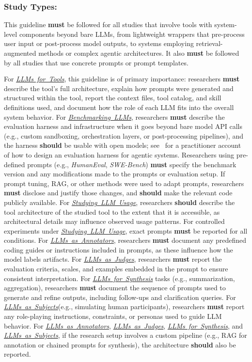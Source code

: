 \documentclass[smallextended]{svjour3}
\newcommand{\must}{\textbf{must}\xspace}
\newcommand{\should}{\textbf{should}\xspace}
\newcommand{\annotators}{\hyperref[sec:llms-as-annotators]{\mbox{\emph{LLMs as Annotators}}}\xspace}
\newcommand{\judges}{\hyperref[sec:llms-as-judges]{\mbox{\emph{LLMs as Judges}}}\xspace}
\newcommand{\synthesis}{\hyperref[sec:llms-for-synthesis]{\mbox{\emph{LLMs for Synthesis}}}\xspace}
\newcommand{\subjects}{\hyperref[sec:llms-as-subjects]{\mbox{\emph{LLMs as Subjects}}}\xspace}
\newcommand{\llmusage}{\hyperref[sec:studying-llm-usage-in-software-engineering]{\mbox{\emph{Studying LLM Usage}}}\xspace}
\newcommand{\newtools}{\hyperref[sec:llms-for-new-software-engineering-tools]{\mbox{\emph{LLMs for Tools}}}\xspace}
\newcommand{\benchmarkingtasks}{\hyperref[sec:benchmarking-llms-for-software-engineering-tasks]{\mbox{\emph{Benchmarking LLMs}}}\xspace}
\newcommand{\annotators}{\href{/study-types/annotators/}{\emph{LLMs as Annotators}}\xspace}
\newcommand{\judges}{\href{/study-types/judges/}{\emph{LLMs as Judges}}\xspace}
\newcommand{\synthesis}{\href{/study-types/synthesis/}{\emph{LLMs for Synthesis}}\xspace}
\newcommand{\subjects}{\href{/study-types/subjects/}{\emph{LLMs as Subjects}}\xspace}
\newcommand{\llmusage}{\href{/study-types/usage/}{\emph{Studying LLM Usage}}\xspace}
\newcommand{\newtools}{\href{/study-types/tools/}{\emph{LLMs for Tools}}\xspace}
\newcommand{\benchmarkingtasks}{\href{/study-types/benchmarking/}{\emph{Benchmarking LLMs}}\xspace}
\newcommand{\guidelinesubsubsection}[1]{\subsubsection{\bfseries #1:}}
\newcommand{\guidelinesubsubsection}[1]{\subsubsection{#1}}
\begin{document}
\guidelinesubsubsection{Study Types}

This guideline \must be followed for all studies that involve tools with system-level components beyond bare LLMs, from lightweight wrappers that pre-process user input or post-process model outputs, to systems employing retrieval-augmented methods or complex agentic architectures.
It also \must be followed by all studies that use concrete prompts or prompt templates.

For \newtools, this guideline is of primary importance: researchers \must describe the tool's full architecture, explain how prompts were generated and structured within the tool, report the context files, tool catalog, and skill definitions used, and document how the role of each LLM fits into the overall system behavior.
For \benchmarkingtasks, researchers \must describe the evaluation harness and infrastructure when it goes beyond bare model API calls (e.g., custom sandboxing, orchestration layers, or post-processing pipelines), and the harness \should be usable with open models; see~\cite{Anthropic2025evals} for a practitioner account of how to design an evaluation harness for agentic systems.
Researchers using pre-defined prompts (e.g., \emph{HumanEval}, \emph{SWE-Bench}) \must specify the benchmark version and any modifications made to the prompts or evaluation setup.
If prompt tuning, RAG, or other methods were used to adapt prompts, researchers \must disclose and justify those changes, and \should make the relevant code publicly available.
For \llmusage, researchers \should describe the tool architecture of the studied tool to the extent that it is accessible, as architectural details may influence observed usage patterns.
For controlled experiments under \llmusage, exact prompts \must be reported for all conditions.
For \annotators, researchers \must document any predefined coding guides or instructions included in prompts, as these influence how the model labels artifacts.
For \judges, researchers \must report the evaluation criteria, scales, and examples embedded in the prompt to ensure consistent interpretation.
For \synthesis tasks (e.g., summarization, aggregation), researchers \must document the sequence of prompts used to generate and refine outputs, including follow-ups and clarification queries.
For \subjects (e.g., simulating human participants), researchers \must report any role-playing instructions, constraints, or personas used to guide LLM behavior.
For \annotators, \judges, \synthesis, and \subjects, if the research setup involves a custom pipeline (e.g., RAG for annotation or chained prompts for synthesis), the architecture \should also be reported.
\end{document}

